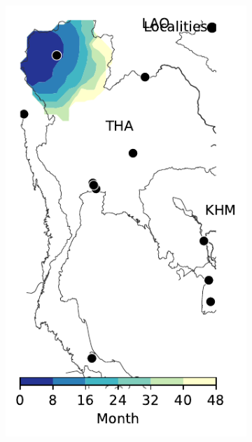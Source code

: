 \documentclass[11pt]{article}
\theoremstyle{definition}
\begin{document}
\begin{figure}[ht]
\begin{subfigure}[b]{.135\textwidth}
    \includegraphics[width=\textwidth]{../../cellular_automata/results/contour/TH_model-B_precip1-out-100_m1_l3.pdf}
\caption{\label{fig:thlBContourInt}} %
\end{subfigure}
\begin{subfigure}[b]{.3\textwidth}

\end{subfigure}
\end{figure}
\end{document}
